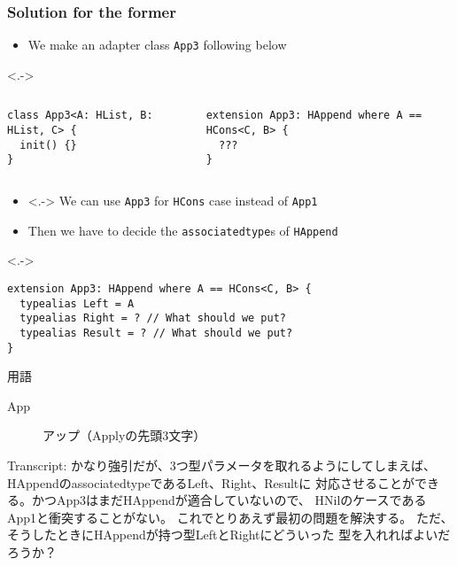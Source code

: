 \begin{frame}[fragile]
  \frametitle{Solution for the former}

  \begin{itemize}
    \item<+-> We make an adapter class \lstinline|App3| following below
  \end{itemize}

  \begin{uncoverenv}<.->
    \begin{columns}
      \begin{column}{0.43\textwidth}
\begin{lstlisting}[style=swift]
class App3<A: HList, B: HList, C> {
  init() {}
}
\end{lstlisting}
      \end{column}
      \begin{column}{0.57\textwidth}
\begin{lstlisting}[style=swift]
extension App3: HAppend where A == HCons<C, B> {
  ???
}   
\end{lstlisting}
      \end{column}
    \end{columns}
  \end{uncoverenv}

  \begin{itemize}
    \item<.-> We can use \lstinline|App3| for \lstinline|HCons| case instead of \lstinline|App1|
    
    \item<+-> Then we have to decide the \lstinline|associatedtype|s
    of \lstinline|HAppend|
  \end{itemize}

  \begin{uncoverenv}<.->
\begin{lstlisting}[style=swift]
extension App3: HAppend where A == HCons<C, B> {
  typealias Left = A
  typealias Right = ? // What should we put?
  typealias Result = ? // What should we put?
}
\end{lstlisting}
  \end{uncoverenv}

  
  \begin{notes}
    \item 用語
    \begin{description}
      \item[App] アップ（Applyの先頭3文字）
    \end{description}

    \item Transcript:
    かなり強引だが、3つ型パラメータを取れるようにしてしまえば、
    HAppendのassociatedtypeであるLeft、Right、Resultに
    対応させることができる。かつApp3はまだHAppendが適合していないので、
    HNilのケースであるApp1と衝突することがない。
    これでとりあえず最初の問題を解決する。
    ただ、そうしたときにHAppendが持つ型LeftとRightにどういった
    型を入れればよいだろうか？
  \end{notes}
\end{frame}

